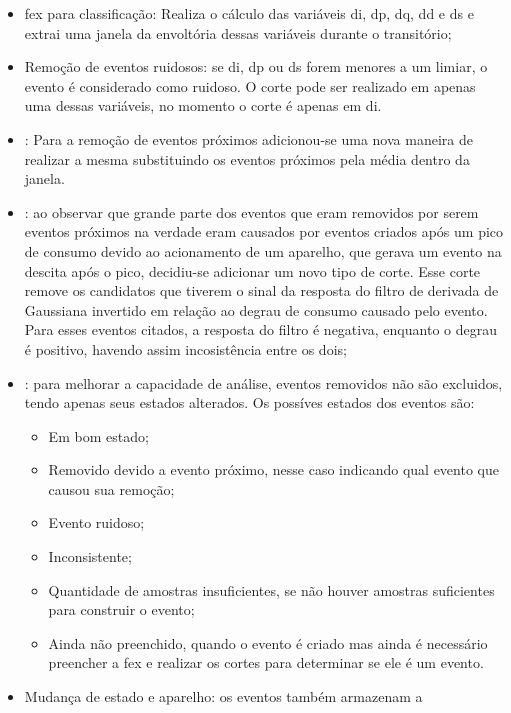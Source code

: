\begin{itemize}
\item \acs{fex} para classificação: Realiza o cálculo das variáveis
\acs{di}, \acs{dp}, \acs{dq}, \acs{dd} e \acs{ds} e extrai uma janela
da envoltória dessas variáveis durante o transitório;
\item Remoção de eventos ruidosos: se \acs{di}, \acs{dp} ou \acs{ds}
forem menores a um limiar, o evento é considerado como ruidoso. O
corte pode ser realizado em apenas uma dessas variáveis, no momento o
corte é apenas em \acs{di}.
\item {}: Para a remoção de eventos próximos
adicionou-se uma nova maneira de realizar a mesma substituindo os
eventos próximos pela média dentro da janela.
\item {}: 
ao observar que grande parte
dos eventos que eram removidos por serem eventos próximos na verdade
eram causados por eventos criados após um pico de consumo devido ao
acionamento de um aparelho, que gerava um evento na descita após o
pico, decidiu-se adicionar um novo tipo de corte. Esse corte remove os
candidatos que tiverem o sinal da resposta do filtro de derivada de
Gaussiana invertido em relação ao degrau de consumo causado pelo
evento. Para esses eventos citados, a resposta do filtro é negativa,
enquanto o degrau é positivo, havendo assim incosistência entre os
dois;
\item {}: para
melhorar a capacidade de análise, eventos removidos não são excluidos,
tendo apenas seus estados alterados. Os possíves estados dos eventos
são:
\begin{itemize}
\item Em bom estado;
\item Removido devido a evento próximo, nesse caso indicando qual
evento que causou sua remoção;
\item Evento ruidoso;
\item Inconsistente;
\item Quantidade de amostras insuficientes, se não houver amostras
suficientes para construir o evento;
\item Ainda não preenchido, quando o evento é criado mas ainda é
necessário preencher a \gls{fex} e realizar os cortes para determinar
se ele é um evento.
\end{itemize}
\item Mudança de estado e aparelho: os eventos também armazenam a

\end{itemize}

